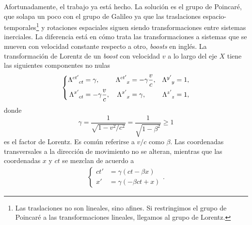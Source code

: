 Afortunadamente, el trabajo ya está hecho. La solución es el grupo de Poincaré, que solapa un poco con el grupo de Galileo ya que las traslaciones espacio-temporales\footnote{Las traslaciones no son lineales, sino afines. Si restringimos el grupo de Poincaré a las transformaciones lineales, llegamos al grupo de Lorentz.} y rotaciones espaciales siguen siendo transformaciones entre sistemas inerciales. La diferencia está en cómo trata las transformaciones a sistemas que se mueven con velocidad constante respecto a otro, \textit{boosts} en inglés. La transformación de Lorentz de un \textit{boost} con velocidad \(v\) a lo largo del eje \(X\) tiene las siguientes componentes no nulas
\begin{align}
    \left\{
    \begin{aligned}
        \tensor{\Lambda}{^{ct'}_{ct}} &= \gamma, & \tensor{\Lambda}{^{ct'}_{x}} &= -\gamma \frac{v}{c}, & \tensor{\Lambda}{^{y'}_y} &= 1, \\
        \tensor{\Lambda}{^{x'}_{ct}} &= -\gamma\frac{v}{c}, & \tensor{\Lambda}{^{x'}_{x}} &= \gamma , & \tensor{\Lambda}{^{z'}_z} &= 1, 
    \end{aligned}
    \right.
\end{align}
donde 
\begin{equation}
    \label{eq.1-gamma}
    \gamma = \frac{1}{\sqrt{1-v^2/c^2}} = \frac{1}{\sqrt{1-\beta^2}} \geq 1
\end{equation}
es el factor de Lorentz. Es común referirse a \(v/c\) como \(\beta\). Las coordenadas transversales a la dirección de movimiento no se alteran, mientras que las coordenadas \(x\) y \(ct\) se mezclan de acuerdo a
\begin{align}
    \left\{
    \begin{aligned}
        ct' &= \gamma \left(ct - \beta x\right)\\
        x'  &= \gamma \left(- \beta ct + x\right)
    \end{aligned}
    \right..
\end{align}

